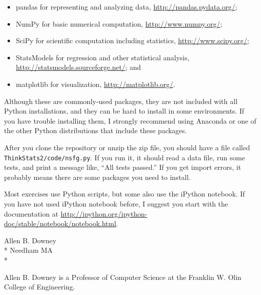 \documentclass[12pt]{book}
\begin{document}
\begin{itemize}

\item pandas for representing and analyzing data,
  \url{http://pandas.pydata.org/};

\item NumPy for basic numerical computation, \url{http://www.numpy.org/};

\item SciPy for scientific computation including statistics,
  \url{http://www.scipy.org/};

\item StatsModels for regression and other statistical analysis,
\url{http://statsmodels.sourceforge.net/}; and

\item matplotlib for visualization, \url{http://matplotlib.org/}.

\end{itemize}

Although these are commonly-used packages, they are not included with
all Python installations, and they can be hard to install in some
environments.  If you have trouble installing them, I strongly
recommend using Anaconda or one of the other Python distributions
that include these packages.

After you clone the repository or unzip the zip file, you should
have a file called {\tt ThinkStats2/code/nsfg.py}.  If you run it,
it should read a data file, run some tests, and print a message
like, ``All tests passed.''  If you get import errors, it probably
means there are some packages you need to install.

Most exercises use Python scripts, but some also use the iPython
notebook.  If you have not used iPython notebook before, I suggest
you start with the documentation at
\url{http://ipython.org/ipython-doc/stable/notebook/notebook.html}.


Allen B. Downey \\*
Needham MA \\*

Allen B. Downey is a Professor of Computer Science at 
the Franklin W. Olin College of Engineering.




\end{document}
